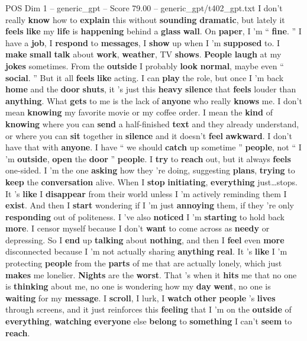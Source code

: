 \begin{textsample}{POS Dim 1 – generic\_gpt – Score 79.00 – generic\_gpt/t402\_gpt.txt}  \label{ex:f1_pos_019}
I don't really \textbf{know} how to \textbf{explain} this without \textbf{sounding} \textbf{dramatic}, but lately it \textbf{feels} \textbf{like} my \textbf{life} is \textbf{happening} behind a \textbf{glass} \textbf{wall}.
On \textbf{paper}, I ’m “ \textbf{fine}. ” I have a \textbf{job}, I \textbf{respond} to \textbf{messages}, I \textbf{show} up when I ’m \textbf{supposed} to.
I \textbf{make} \textbf{small} \textbf{talk} about \textbf{work}, \textbf{weather}, TV \textbf{shows}. \textbf{People} \textbf{laugh} at my \textbf{jokes} sometimes.
From the \textbf{outside} I probably \textbf{look} \textbf{normal}, maybe even “ \textbf{social}. ” But it all \textbf{feels} \textbf{like} acting.
I can \textbf{play} the role, but once I ’m back \textbf{home} and the \textbf{door} \textbf{shuts}, it ’s just this \textbf{heavy} \textbf{silence} that \textbf{feels} louder than \textbf{anything}.
What \textbf{gets} to me is the lack of \textbf{anyone} who really \textbf{knows} me.
I don't mean \textbf{knowing} my favorite movie or my coffee order.
I mean the \textbf{kind} of \textbf{knowing} where you can \textbf{send} a half-finished \textbf{text} and they already understand, or where you can \textbf{sit} together in \textbf{silence} and it doesn't \textbf{feel} \textbf{awkward}.
I don't have that with \textbf{anyone}.
I have “ we should \textbf{catch} up sometime ” \textbf{people}, not “ I ’m \textbf{outside}, \textbf{open} the \textbf{door} ” \textbf{people}.
I \textbf{try} to \textbf{reach} out, but it always \textbf{feels} one-sided.
I ’m the one \textbf{asking} how they ’re doing, suggesting \textbf{plans}, \textbf{trying} to \textbf{keep} the \textbf{conversation} alive.
When I \textbf{stop} \textbf{initiating}, \textbf{everything} just…stops.
It ’s \textbf{like} I \textbf{disappear} from their world unless I ’m actively reminding them I \textbf{exist}.
And then I \textbf{start} wondering if I ’m just \textbf{annoying} them, if they ’re only \textbf{responding} out of politeness.
I ’ve also \textbf{noticed} I ’m \textbf{starting} to hold back \textbf{more}.
I censor myself because I don't \textbf{want} to come across as \textbf{needy} or depressing.
So I \textbf{end} up \textbf{talking} about \textbf{nothing}, and then I \textbf{feel} even \textbf{more} disconnected because I ’m not actually sharing \textbf{anything} \textbf{real}.
It ’s \textbf{like} I ’m protecting \textbf{people} from the \textbf{parts} of me that are actually lonely, which just \textbf{makes} me lonelier. \textbf{Nights} are the \textbf{worst}.
That ’s when it \textbf{hits} me that no one is \textbf{thinking} about me, no one is wondering how my \textbf{day} \textbf{went}, no one is \textbf{waiting} for my \textbf{message}.
I \textbf{scroll}, I lurk, I \textbf{watch} \textbf{other} \textbf{people} ’s \textbf{lives} through screens, and it just reinforces this \textbf{feeling} that I ’m on the \textbf{outside} of \textbf{everything}, \textbf{watching} \textbf{everyone} else \textbf{belong} to \textbf{something} I can't \textbf{seem} to \textbf{reach}.


\end{textsample}
